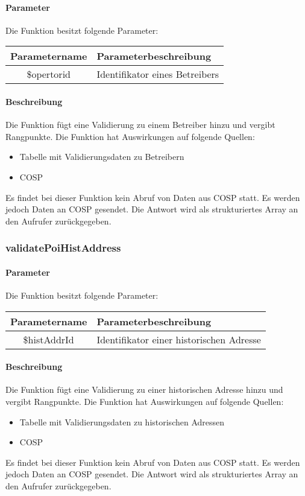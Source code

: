 \paragraph{Parameter} Die Funktion besitzt folgende Parameter:
\begin{table}[H]
	\begin{tabular}{|c|p{11cm}|}
		\hline
		\textbf{Parametername} & \textbf{Parameterbeschreibung} \\ \hline
		\$opertorid & Identifikator eines Betreibers \\ \hline
	\end{tabular}
\end{table}
\paragraph{Beschreibung} Die Funktion fügt eine Validierung zu einem Betreiber hinzu und vergibt Rangpunkte. Die Funktion hat Auswirkungen auf folgende Quellen:
\begin{itemize}
	\item Tabelle mit Validierungsdaten zu Betreibern
	\item COSP
\end{itemize}
Es findet bei dieser Funktion kein Abruf von Daten aus {\glqq COSP\grqq} statt. Es werden jedoch Daten an {\glqq COSP\grqq} gesendet. Die Antwort wird als strukturiertes Array an den Aufrufer zurückgegeben.
\subsubsection{validatePoiHistAddress}
\paragraph{Parameter} Die Funktion besitzt folgende Parameter:
\begin{table}[H]
	\begin{tabular}{|c|p{11cm}|}
		\hline
		\textbf{Parametername} & \textbf{Parameterbeschreibung} \\ \hline
		\$histAddrId & Identifikator einer historischen Adresse \\ \hline
	\end{tabular}
\end{table}
\paragraph{Beschreibung} Die Funktion fügt eine Validierung zu einer historischen Adresse hinzu und vergibt Rangpunkte. Die Funktion hat Auswirkungen auf folgende Quellen:
\begin{itemize}
	\item Tabelle mit Validierungsdaten zu historischen Adressen
	\item COSP
\end{itemize}
Es findet bei dieser Funktion kein Abruf von Daten aus {\glqq COSP\grqq} statt. Es werden jedoch Daten an {\glqq COSP\grqq} gesendet. Die Antwort wird als strukturiertes Array an den Aufrufer zurückgegeben.

